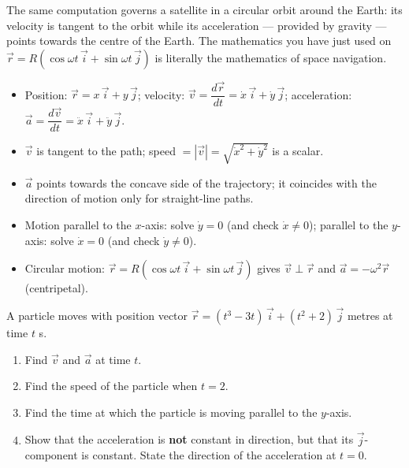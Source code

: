 \documentclass[11pt]{article}
\begin{document}
\begin{savaistu}
The same computation governs a satellite in a circular orbit around the Earth: its velocity is tangent to the orbit while its acceleration — provided by gravity — points towards the centre of the Earth. The mathematics you have just used on $\vec{r} = R(\cos\omega t\,\vec{i} + \sin\omega t\,\vec{j})$ is literally the mathematics of space navigation.
\end{savaistu}

\begin{aretenir}
\begin{itemize}
\item Position: $\vec{r} = x\,\vec{i} + y\,\vec{j}$; velocity: $\vec{v} = \dfrac{d\vec{r}}{dt} = \dot{x}\,\vec{i} + \dot{y}\,\vec{j}$; acceleration: $\vec{a} = \dfrac{d\vec{v}}{dt} = \ddot{x}\,\vec{i} + \ddot{y}\,\vec{j}$.
\item $\vec{v}$ is tangent to the path; speed $= |\vec{v}| = \sqrt{\dot{x}^{2} + \dot{y}^{2}}$ is a scalar.
\item $\vec{a}$ points towards the concave side of the trajectory; it coincides with the direction of motion only for straight-line paths.
\item Motion parallel to the $x$-axis: solve $\dot{y} = 0$ (and check $\dot{x} \neq 0$); parallel to the $y$-axis: solve $\dot{x} = 0$ (and check $\dot{y} \neq 0$).
\item Circular motion: $\vec{r} = R(\cos\omega t\,\vec{i} + \sin\omega t\,\vec{j})$ gives $\vec{v} \perp \vec{r}$ and $\vec{a} = -\omega^{2}\vec{r}$ (centripetal).
\end{itemize}
\end{aretenir}

\begin{exercice}[Practice]
A particle moves with position vector $\vec{r} = (t^{3} - 3t)\,\vec{i} + (t^{2} + 2)\,\vec{j}$ metres at time $t$ s.
\begin{enumerate}
\item Find $\vec{v}$ and $\vec{a}$ at time $t$.
\item Find the speed of the particle when $t = 2$.
\item Find the time at which the particle is moving parallel to the $y$-axis.
\item Show that the acceleration is \textbf{not} constant in direction, but that its $\vec{j}$-component is constant. State the direction of the acceleration at $t = 0$.
\end{enumerate}
\end{exercice}
\end{document}
